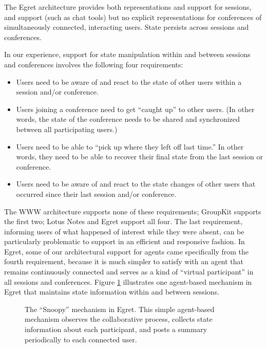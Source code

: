 The Egret architecture provides both representations and support for
sessions, and support (such as chat tools) but no explicit representations
for conferences of simultaneously connected, interacting users.  State
persists across sessions and conferences. 

In our experience, support for state manipulation within and between
sessions and conferences involves the following four requirements:

\begin{itemize}

\item Users need to be aware of and react to the state of other users
  within a session and/or conference.

\item  Users joining a conference need to get ``caught up'' to other
  users.  (In other words, the state of the conference needs to be shared
  and synchronized between all participating users.)

\item  Users need to be able to ``pick up where they left off last time.''
  In other words, they need to be able to recover their final state from
  the last session or conference. 

\item  Users need to be aware of and react to the state changes of other
  users that occurred since their last session and/or conference.

\end{itemize}


The WWW architecture supports none of these requirements; GroupKit supports
the first two; Lotus Notes and Egret support all four.  The last
requirement, informing users of what happened of interest while they were
absent, can be particularly problematic to support in an efficient and
responsive fashion.  In Egret, some of our architectural support for agents
came specifically from the fourth requirement, because it is much simpler to satisfy with
an agent that remains continuously connected and serves as a kind of
``virtual participant'' in all sessions and conferences. Figure
\ref{fig:snoopy} illustrates one agent-based mechanism in Egret that maintains
state information within and between sessions. 

\begin{figure}[t]
  \centerline{} 
\caption{The ``Snoopy'' mechanism in Egret. This simple agent-based mechanism
observes the collaborative process, collects state information about each
participant, and posts a summary periodically to each connected user.}
\label{fig:snoopy}
\end{figure}



